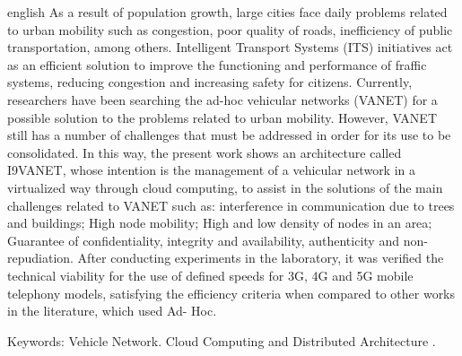 \documentclass[
	12pt,				%
	oneside,			%
	a4paper,			%
	english,			%
	brazil				%
	]{abntex2ppgsi}
\begin{document}
\begin{resumo}[Abstract]
\begin{otherlanguage*}{english}
As a result of population growth, large cities face daily problems related to urban mobility such as congestion, poor quality of roads, inefficiency of public transportation, among others. Intelligent Transport Systems (ITS) initiatives act as an efficient solution to improve the functioning and performance of fraffic systems, reducing congestion and increasing safety for citizens. Currently, researchers have been searching the ad-hoc vehicular networks (VANET) for a possible solution to the problems related to urban mobility. However, VANET still has a number of challenges that must be addressed in order for its use to be consolidated. In this way, the present work shows an architecture called I9VANET, whose intention is the management of a vehicular network in a virtualized way through cloud computing, to assist in the solutions of the main challenges related to VANET such as: interference in communication due to trees and buildings; High node mobility; High and low density of nodes in an area; Guarantee of confidentiality, integrity and availability, authenticity and non-repudiation. After conducting experiments in the laboratory, it was verified the technical viability for the use of defined speeds for 3G, 4G and 5G mobile telephony models, satisfying the efficiency criteria when compared to other works in the literature, which used Ad- Hoc.

Keywords: Vehicle Network. Cloud Computing and Distributed Architecture .
\end{otherlanguage*}
\end{resumo}

\listoffigures*
\cleardoublepage


\listoftables*
\cleardoublepage
\end{document}
